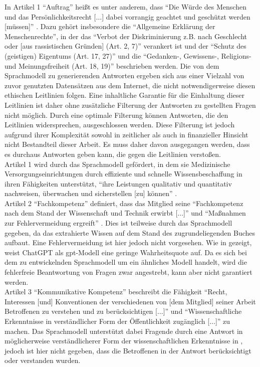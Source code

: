 In Artikel 1 \enquote{Auftrag} heißt es unter anderem, dass
\enquote{Die Würde des Menschen und das Persönlichkeitsrecht [$\dots$] dabei vorrangig geachtet und geschützt werden [müssen]} \citep{gmds_eth}.
Dazu gehört insbesondere die \enquote{Allgemeine Erklärung der Menschenrechte},
in der das \enquote{Verbot der Diskriminierung z.B. nach Geschlecht oder [aus rassistischen Gründen] (Art. 2, 7)}
verankert ist und
der \enquote{Schutz des (geistigen) Eigentums (Art. 17, 27)} und die \enquote{Gedanken-, Gewissens-, Religions- und Meinungsfreiheit (Art. 18, 19)} beschrieben werden.
Die von dem Sprachmodell zu generierenden Antworten ergeben sich aus einer Vielzahl von zuvor genutzten Datensätzen aus dem Internet, die nicht notwendigerweise diesen ethischen Leitlinien folgen.
Eine inhaltliche Garantie für die Einhaltung dieser Leitlinien ist daher ohne zusätzliche Filterung der Antworten zu gestellten Fragen nicht möglich.
Durch eine optimale Filterung können Antworten, die den Leitlinien widersprechen, ausgeschlossen werden.
Diese Filterung ist jedoch aufgrund ihrer Komplexität sowohl in zeitlicher als auch in finanzieller Hinsicht nicht Bestandteil dieser Arbeit.
Es muss daher davon ausgegangen werden, dass es durchaus Antworten geben kann, die gegen die Leitlinien verstoßen.\\

Artikel 1 wird durch das Sprachmodell gefördert, in dem sie Medizinische Versorgungseinrichtungen durch effiziente und schnelle Wissensbeschaffung in ihren Fähigkeiten unterstützt,
\enquote{ihre Leistungen qualitativ und quantitativ nachweisen, überwachen und sicherstellen [zu] können} \citep{gmds_eth}.\\

Artikel 2 \enquote{Fachkompetenz} definiert, dass das Mitglied seine \enquote{Fachkompetenz nach dem Stand der Wissenschaft und Technik erwirbt [$\dots$]} und \enquote{Maßnahmen zur Fehlervermeidung ergreift} \citep{gmds_eth}.
Dies ist teilweise durch das Sprachmodell gegeben, da das extrahierte Wissen auf dem Stand des zugrundeliegenden Buches \citet{bb} aufbaut.
Eine Fehlervermeidung ist hier jedoch nicht vorgesehen.
Wie in \citet{chatgpt_qas} gezeigt, weist ChatGPT als \ac{gpt}-Modell eine geringe Wahrheitsquote auf.
Da es sich bei dem zu entwickelnden Sprachmodell um ein ähnliches Modell handelt, wird die fehlerfreie Beantwortung von Fragen zwar angestrebt, kann aber nicht garantiert werden.\\

Artikel 3 \enquote{Kommunikative Kompetenz} beschreibt die Fähigkeit
\enquote{Recht, Interessen [und] Konventionen der verschiedenen von [dem Mitglied] seiner Arbeit Betroffenen zu verstehen und zu berücksichtigen [$\dots$]} und
\enquote{Wissenschaftliche Erkenntnisse in verständlicher Form der Öffentlichkeit zugänglich [$\dots$]} \citep{gmds_eth} zu machen.
Das Sprachmodell unterstützt dabei Fragende durch eine Antwort in möglicherweise verständlicherer Form der wissenschaftlichen Erkenntnisse in \citet{bb},
jedoch ist hier nicht gegeben, dass die Betroffenen in der Antwort berücksichtigt oder verstanden wurden.\\

